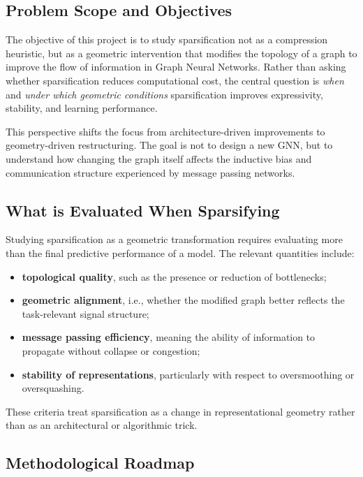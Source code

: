 \documentclass[letterpaper,12pt]{article}
\begin{document}
\subsection{Problem Scope and Objectives}

The objective of this project is to study sparsification not as a compression heuristic, but as a geometric intervention that modifies the topology of a graph to improve the flow of information in Graph Neural Networks. Rather than asking whether sparsification reduces computational cost, the central question is \textit{when} and \textit{under which geometric conditions} sparsification improves expressivity, stability, and learning performance.

This perspective shifts the focus from architecture-driven improvements to geometry-driven restructuring. The goal is not to design a new GNN, but to understand how changing the graph itself affects the inductive bias and communication structure experienced by message passing networks.

\subsection{What is Evaluated When Sparsifying}

Studying sparsification as a geometric transformation requires evaluating more than the final predictive performance of a model. The relevant quantities include:
\begin{itemize}
    \item \textbf{topological quality}, such as the presence or reduction of bottlenecks;
    \item \textbf{geometric alignment}, i.e., whether the modified graph better reflects the task-relevant signal structure;
    \item \textbf{message passing efficiency}, meaning the ability of information to propagate without collapse or congestion;
    \item \textbf{stability of representations}, particularly with respect to oversmoothing or oversquashing.
\end{itemize}
These criteria treat sparsification as a change in representational geometry rather than as an architectural or algorithmic trick.

\subsection{Methodological Roadmap}
\end{document}
